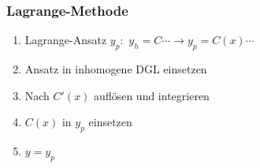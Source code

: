         \subsubsection{Lagrange-Methode}
            \begin{enumerate}
                \item Lagrange-Ansatz $y_p$:\ $y_h = C \cdots \to y_p = C(x) \cdots$
                \item Ansatz in inhomogene DGL einsetzen
                \item Nach $C'(x)$ auflösen und integrieren
                \item $C(x)$ in $y_p$ einsetzen
                \item $y = y_p$
            \end{enumerate}